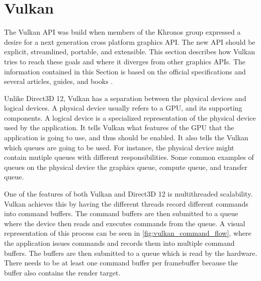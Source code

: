 \section{Vulkan}\label{sec:vulkan}
\begin{sectionmeta}
The Vulkan \gls{API} was build when members of the Khronos group expressed a desire for a next generation cross platform graphics \gls{API}.
The new \gls{API} should be explicit, streamlined, portable, and extensible.
This section describes how Vulkan tries to reach these goals and where it diverges from other graphics \glspl{API}.
The information contained in this Section is based on the official specifications \cite{khronos2017vulkan} and several articles, guides, and books \cite{singh2016learning, blackert_2016_evaluation, overvoorde2017vulkan}.
\end{sectionmeta}

Unlike Direct3D 12, Vulkan has a separation between the physical devices and logical devices. 
A physical device usually refers to a \gls{GPU}, and its supporting components.
A logical device is a specialized representation of the physical device used by the application.
It tells Vulkan what features of the \gls{GPU} that the application is going to use, and thus should be enabled.
It also tells the Vulkan which queues are going to be used.
For instance, the physical device might contain mutiple queues with different responsibilities.
Some common examples of queues on the physical device the graphics queue, compute queue, and transfer queue.

One of the features of both Vulkan and Direct3D 12 is multithreaded scalability.
Vulkan achieves this by having the different threads record different commands into command buffers.
The command buffers are then submitted to a queue where the device then reads and executes commands from the queue.
A visual representation of this process can be seen in \cref{fig:vulkan_command_flow}, where the application issues commands and records them into multiple command buffers.
The buffers are then submitted to a queue which is read by the hardware.
There needs to be at least one command buffer per framebuffer because the buffer also contains the render target.


